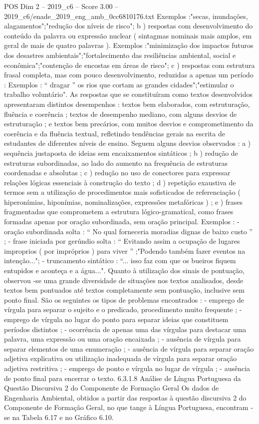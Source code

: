 \begin{textsample}{POS Dim 2 – 2019\_c6 – Score 3.00 – 2019\_c6/enade\_2019\_eng\_amb\_0cc6810176.txt}
Exemplos :"secas, inundações, alagamentos";"redução dos níveis de risco"; b ) respostas com desenvolvimento do conteúdo da palavra ou expressão nuclear ( sintagmas nominais mais amplos, em geral de mais de quatro palavras ).
Exemplos :"minimização dos impactos futuros dos desastres ambientais";"fortalecimento das resiliências ambiental, social e econômica";"contenção de encostas em áreas de risco"; c ) respostas com estrutura frasal completa, mas com pouco desenvolvimento, reduzidas a apenas um período : Exemplos : “ dragar ” os rios que cortam as grandes cidades";"estimular o trabalho voluntário".
As respostas que se constituíram como textos desenvolvidos apresentaram distintos desempenhos : textos bem elaborados, com estruturação, fluência e coerência ; textos de desempenho mediano, com alguns desvios de estruturação ; e textos bem precários, com muitos desvios e comprometimento da coerência e da fluência textual, refletindo tendências gerais na escrita de estudantes de diferentes níveis de ensino.
Seguem alguns desvios observados : a ) sequência justaposta de ideias sem encaixamentos sintáticos ; b ) redução de estruturas subordinadas, ao lado do aumento na frequência de estruturas coordenadas e absolutas ; c ) redução no uso de conectores para expressar relações lógicas essenciais à construção do texto ; d ) repetição exaustiva de termos sem a utilização de procedimentos mais sofisticados de referenciação ( hiperonímias, hiponímias, nominalizações, expressões metafóricas ) ; e ) frases fragmentadas que comprometem a estrutura lógico-gramatical, como frases formadas apenas por oração subordinada, sem oração principal.
Exemplos : - oração subordinada solta : “ No qual forneceria moradias dignas de baixo custo ” ; - frase iniciada por gerúndio solta : “ Evitando assim a ocupação de lugares improprios ( por impróprios ) para viver ” ;"Podendo também fazer eventos na intenção..."; - truncamento sintático : “... isso faz com que os bueiros fiquem entupidos e aconteça e a água...".
Quanto à utilização dos sinais de pontuação, observou -se uma grande diversidade de situações nos textos analisados, desde textos bem pontuados até textos completamente sem pontuação, inclusive sem ponto final.
São os seguintes os tipos de problemas encontrados : - emprego de vírgula para separar o sujeito e o predicado, procedimento muito frequente ; - emprego de vírgula no lugar do ponto para separar ideias que constituem períodos distintos ; - ocorrência de apenas uma das vírgulas para destacar uma palavra, uma expressão ou uma oração encaixada ; - ausência de vírgula para separar elementos de uma enumeração ; - ausência de vírgula para separar oração adjetiva explicativa ou utilização inadequada de vírgula para separar oração adjetiva restritiva ; - emprego de ponto e vírgula no lugar de vírgula ; - ausência de ponto final para encerrar o texto. 6.3.1.8 Análise de Língua Portuguesa da Questão Discursiva 2 do Componente de Formação Geral Os dados de Engenharia Ambiental, obtidos a partir das respostas à questão discursiva 2 do Componente de Formação Geral, no que tange à Língua Portuguesa, encontram -se na Tabela 6.17 e no Gráfico 6.10.

\end{textsample}
